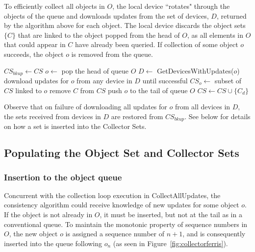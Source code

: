 To efficiently collect all objects in $O$, the local device ``rotates" through
the objects of the queue and downloads updates from the set of devices, $D$,
returned by the algorithm above for each object. The local device discards the
object sets $\{C\}$ that are linked to the object popped from the head of $O$,
as all elements in $O$ that could appear in $C$ have already been queried. If
collection of some object $o$ succeeds, the object $o$ is removed from the
queue.
\begin{algorithmic}
\State $CS_{bkup} \gets CS$
 \State $o\gets$ pop the head of queue $O$
 \State $D\gets$ GetDevicesWithUpdates($o$)
 \State download updates for $o$ from any device in $D$ until successful
 \State $CS_o \gets$ subset of $CS$ linked to $o$
     \State remove $C$ from $CS$
 \EndFor
    \State push $o$ to the tail of queue $O$
          \State $CS \gets CS \cup \{C_d\}$
      \EndFor
    \EndFor
 \EndIf
\EndWhile
\EndFunction
\end{algorithmic}
Observe that on failure of downloading all updates for $o$ from all devices in
$D$, the sets received from devices in $D$ are restored from $CS_{bkup}$. See
below for details on how a set is inserted into the Collector Sets.

\subsection*{Populating the Object Set and Collector Sets}

\subsubsection*{Insertion to the object queue}
Concurrent with the collection loop execution in CollectAllUpdates, the
consistency algorithm could receive knowledge of new updates for some object
$o$. If the object is not already in $O$, it must be inserted, but not at the
tail as in a conventional queue. To maintain the monotonic property of sequence
numbers in $O$, the new object $o$ is assigned a sequence number of $n+1$, and
is consequently inserted into the queue following $o_n$ (as seen in
Figure~\ref{fig:collectorferris}).

